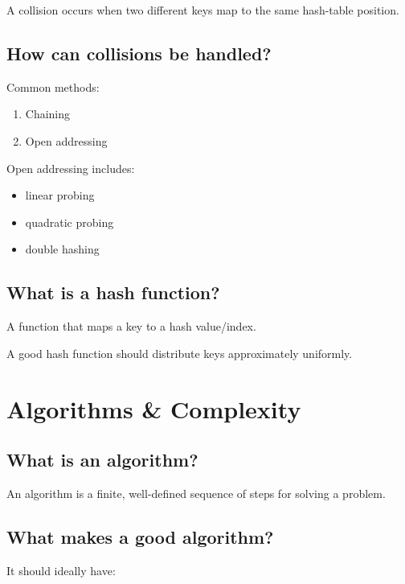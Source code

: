 A collision occurs when two different keys map to the same hash-table position.

\medskip

\subsection{How can collisions be handled?}

Common methods:

\begin{enumerate}
  \item Chaining
  \item Open addressing
\end{enumerate}

Open addressing includes:

\begin{itemize}
  \item linear probing
  \item quadratic probing
  \item double hashing
\end{itemize}

\medskip

\subsection{What is a hash function?}

A function that maps a key to a hash value/index.

A good hash function should distribute keys approximately uniformly.

\medskip

\section{Algorithms \& Complexity}

\subsection{What is an algorithm?}

An algorithm is a finite, well-defined sequence of steps for solving a problem.

\medskip

\subsection{What makes a good algorithm?}

It should ideally have:

